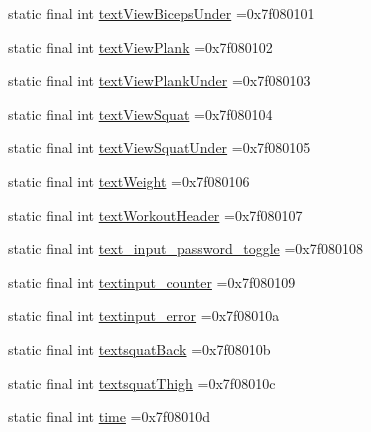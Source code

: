\begin{DoxyCompactItemize}
\item 
static final int \mbox{\hyperlink{classcom_1_1example_1_1trainawearapplication_1_1_r_1_1id_a9d96d112f17312e8a597c261c81d2ab2}{text\+View\+Biceps\+Under}} =0x7f080101
\item 
static final int \mbox{\hyperlink{classcom_1_1example_1_1trainawearapplication_1_1_r_1_1id_a14cb3a5339a016072be6c0f87cac1a8d}{text\+View\+Plank}} =0x7f080102
\item 
static final int \mbox{\hyperlink{classcom_1_1example_1_1trainawearapplication_1_1_r_1_1id_ac25d082a84cc5a228ed7b78ec4ab7c49}{text\+View\+Plank\+Under}} =0x7f080103
\item 
static final int \mbox{\hyperlink{classcom_1_1example_1_1trainawearapplication_1_1_r_1_1id_aaeddaee2f3e6f776e6651b5126a5d103}{text\+View\+Squat}} =0x7f080104
\item 
static final int \mbox{\hyperlink{classcom_1_1example_1_1trainawearapplication_1_1_r_1_1id_ac5b647b6eff03a6cebd63aea9a649ce6}{text\+View\+Squat\+Under}} =0x7f080105
\item 
static final int \mbox{\hyperlink{classcom_1_1example_1_1trainawearapplication_1_1_r_1_1id_a503e027b6a16bcd55a07778089188205}{text\+Weight}} =0x7f080106
\item 
static final int \mbox{\hyperlink{classcom_1_1example_1_1trainawearapplication_1_1_r_1_1id_a06bfee63faf8344930f419b8fea80f09}{text\+Workout\+Header}} =0x7f080107
\item 
static final int \mbox{\hyperlink{classcom_1_1example_1_1trainawearapplication_1_1_r_1_1id_a1d989bc82557a71d03839a390a9876b1}{text\+\_\+input\+\_\+password\+\_\+toggle}} =0x7f080108
\item 
static final int \mbox{\hyperlink{classcom_1_1example_1_1trainawearapplication_1_1_r_1_1id_a81d42fc142a683ce3ffec26570f4d770}{textinput\+\_\+counter}} =0x7f080109
\item 
static final int \mbox{\hyperlink{classcom_1_1example_1_1trainawearapplication_1_1_r_1_1id_afeb0b99d831ea9701f2a7499e8622998}{textinput\+\_\+error}} =0x7f08010a
\item 
static final int \mbox{\hyperlink{classcom_1_1example_1_1trainawearapplication_1_1_r_1_1id_a5352ea35f137c55d4933204361ac9dd6}{textsquat\+Back}} =0x7f08010b
\item 
static final int \mbox{\hyperlink{classcom_1_1example_1_1trainawearapplication_1_1_r_1_1id_a6b2aec61c387cc1c66490d8f6c646be5}{textsquat\+Thigh}} =0x7f08010c
\item 
static final int \mbox{\hyperlink{classcom_1_1example_1_1trainawearapplication_1_1_r_1_1id_ab5a751938b52332d94f872634e021124}{time}} =0x7f08010d

\end{DoxyCompactItemize}
